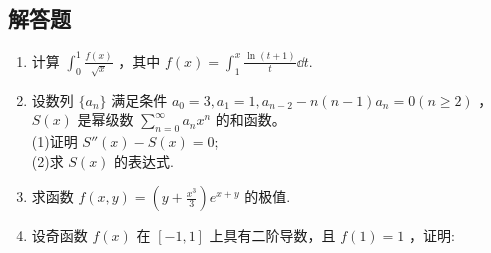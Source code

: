 \subsection{解答题}
\begin{enumerate}
\item 计算 $\displaystyle \int_{0}^{1}\frac{f(x)}{\sqrt{x}}$ ，其中  $\displaystyle f(x)=\int_{1}^{x}\frac{\ln(t+1)}{t}\dd{t}$.
\item 设数列 $\{a_n\}$ 满足条件 $a_0=3,a_1=1,a_{n-2}-n(n-1)a_n=0(n\ge 2)$ ， $S(x)$ 是幂级数 $\displaystyle \sum_{n=0}^\infty a_nx^n$ 的和函数。\\
(1)证明 $S''(x)-S(x)=0$;\\
(2)求 $S(x)$ 的表达式.
\item 求函数 $\displaystyle f(x,y)=(y+\frac{x^3}{3})e^{x+y}$ 的极值.
\item 设奇函数 $f(x)$ 在 $[-1,1]$ 上具有二阶导数，且 $f(1)=1$ ，证明:\\

\end{enumerate}